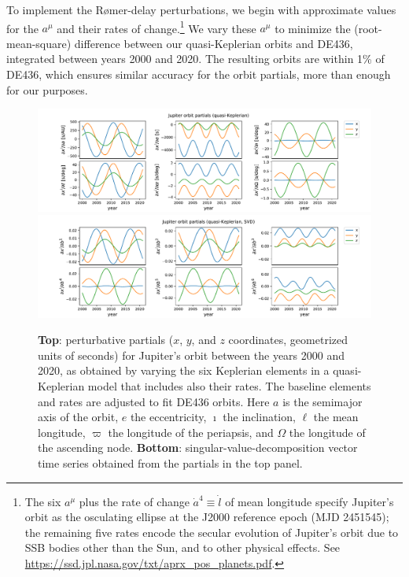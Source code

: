 \documentclass{aastex63}
\begin{document}
\begin{itemize}
To implement the R{\o}mer-delay perturbations, we begin with approximate values for the $a^\mu$ and their rates of change.\footnote{The six $a^\mu$ plus the rate of change $\dot{a}^4 \equiv \dot{l}$ of mean longitude specify Jupiter's orbit as the osculating ellipse at the J2000 reference epoch (MJD 2451545); the remaining five rates encode the secular evolution of Jupiter's orbit due to SSB bodies other than the Sun, and to other physical effects. See \href{https://ssd.jpl.nasa.gov/txt/aprx_pos_planets.pdf}{https://ssd.jpl.nasa.gov/txt/aprx\_pos\_planets.pdf}.}
We vary these $a^\mu$ to minimize the (root-mean-square) difference between our quasi-Keplerian orbits and DE436, integrated between years 2000 and 2020. The resulting orbits are within 1\% of DE436, which ensures similar accuracy for the orbit partials, more than enough for our purposes.
%
\begin{figure}[t]
    \centering
    \includegraphics[width=\columnwidth]{figures/JupiterPartials.pdf}
    \includegraphics[width=\columnwidth]{figures/JupiterPartialsSVD.pdf}
    \caption{\textbf{Top}: perturbative partials ($x$, $y$, and $z$ coordinates, geometrized units of seconds) for Jupiter's orbit between the years 2000 and 2020, as obtained by varying the six Keplerian elements in a quasi-Keplerian model that includes also their rates. The baseline elements and rates are adjusted to fit DE436 orbits.
    Here $a$ is the semimajor axis of the orbit, $e$ the eccentricity, $\imath$ the inclination, $\ell$ the mean longitude, $\varpi$ the longitude of the periapsis, and $\Omega$ the longitude of the ascending node. 
    \textbf{Bottom}: singular-value-decomposition vector time series obtained from the partials in the top panel.}
    \label{fig:jupiterorbit}
\end{figure}


\end{itemize}
\end{document}
